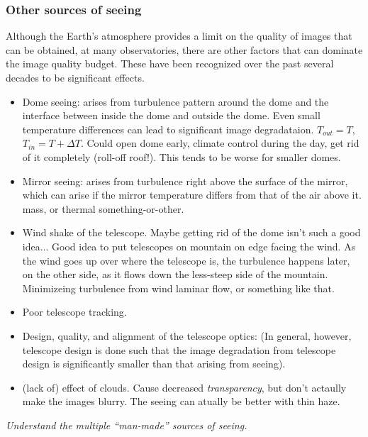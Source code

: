 \documentclass[12pt]{article}
\newcommand{\mynotes}[1]{\textcolor{myBlue}{#1}}
\newcommand{\test}[1]{%
    \begin{center}
        {\parbox{0.9\textwidth}{\textit{\small#1}}}
    \end{center}}
\begin{document}
\subsubsection{Other sources of seeing}
Although the Earth's atmosphere provides a limit on the quality of
images that can be obtained, at many observatories, there are other
factors that can dominate the image quality budget. These have been
recognized over the past several decades to be significant effects.
\begin{itemize}
    \item Dome seeing: arises from turbulence pattern around the dome and the
        interface between inside the dome and outside the dome. Even small
        temperature differences can lead to significant image degradataion.
        \textcolor{myBlue}{$T_{out} = T$, $T_{in} = T + \Delta T$. Could open
        dome early, climate control during the day, get rid of it completely
        (roll-off roof!). This tends to be worse for smaller domes.}
    \item Mirror seeing: arises from turbulence right above the surface of the
        mirror, which can arise if the mirror temperature differs from that of
        the air above it. \textcolor{myBlue}{%
        mass, or thermal something-or-other}.
    \item Wind shake of the telescope. \mynotes{Maybe getting rid
        of the dome isn't such a good idea$\ldots$ Good idea to put
        telescopes on mountain on edge facing the wind. As the wind goes up
        over where the telescope is, the turbulence happens later, on the
        other side, as it flows down the less-steep side of the mountain.
        Minimizeing turbulence from wind laminar flow, or something like
        that.}
    \item Poor telescope tracking.
    \item Design, quality, and alignment of the telescope optics: (In general,
        however, telescope design is done such that the image degradation from
        telescope design is significantly smaller than that arising from
        seeing).
    \item (lack of) effect of clouds. \mynotes{Cause decreased
        \emph{transparency}, but don't actaully make the images blurry. The
        seeing can atually be better with thin haze.}
\end{itemize}

\test{Understand the multiple ``man-made'' sources of seeing.}
\end{document}
